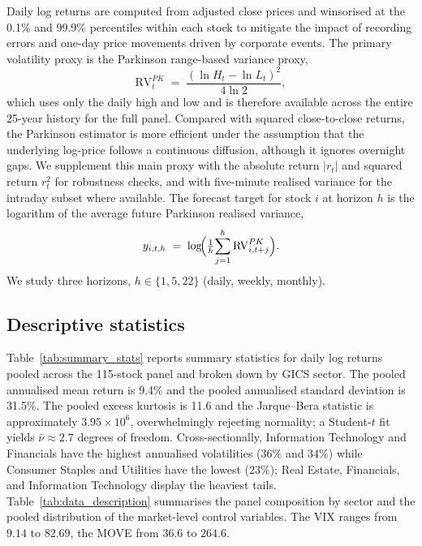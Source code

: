 \documentclass[11pt,a4paper]{article}
\newcommand{\RVPK}{\mathrm{RV}^{PK}}
\begin{document}
Daily log returns are computed from adjusted close prices and winsorised
at the 0.1\% and 99.9\% percentiles within each stock to mitigate the
impact of recording errors and one-day price movements driven by
corporate events. The primary volatility proxy is the Parkinson
range-based variance proxy,
\begin{equation}
  \RVPK_t \;=\; \frac{(\ln H_t - \ln L_t)^2}{4\ln 2},
  \label{eq:parkinson}
\end{equation}
which uses only the daily high and low and is therefore available across
the entire 25-year history for the full panel. Compared with squared
close-to-close returns, the Parkinson estimator is more efficient under
the assumption that the underlying log-price follows a continuous
diffusion, although it ignores overnight gaps. We supplement this main
proxy with the absolute return $|r_t|$ and squared return $r_t^2$ for
robustness checks, and with five-minute realised variance for the
intraday subset where available. The forecast target for stock $i$ at
horizon $h$ is the logarithm of the average future Parkinson realised
variance,
\begin{equation}
  y_{i,t,h} \;=\; \log\!\Bigl(\tfrac{1}{h}\!\sum_{j=1}^{h}
  \RVPK_{i,t+j}\Bigr).
\end{equation}
We study three horizons, $h\in\{1,5,22\}$ (daily, weekly, monthly).

\subsection{Descriptive statistics}

Table~\ref{tab:summary_stats} reports summary statistics for daily log
returns pooled across the 115-stock panel and broken down by GICS
sector. The pooled annualised mean return is 9.4\% and the pooled
annualised standard deviation is 31.5\%. The pooled excess kurtosis is
11.6 and the Jarque--Bera statistic is approximately $3.95\!\times\!10^6$,
overwhelmingly rejecting normality; a Student-$t$ fit yields
$\hat\nu\approx 2.7$ degrees of freedom. Cross-sectionally, Information
Technology and Financials have the highest annualised volatilities
(36\% and 34\%) while Consumer Staples and Utilities have the lowest
(23\%); Real Estate, Financials, and Information Technology display the
heaviest tails. Table~\ref{tab:data_description} summarises the panel
composition by sector and the pooled distribution of the market-level
control variables. The VIX ranges from $9.14$ to $82.69$, the MOVE from
$36.6$ to $264.6$.
\FloatBarrier

\end{document}
